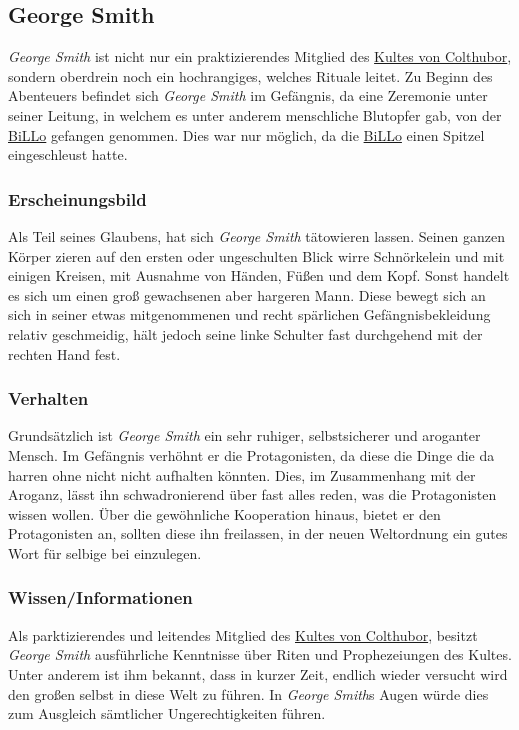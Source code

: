 \subsection{George Smith}
\label{pers:george-smith}
    \emph{George Smith} ist nicht nur ein praktizierendes Mitglied des \hyperref[sons:kult-von-colthubor]{Kultes von Colthubor}, sondern oberdrein noch ein hochrangiges, welches Rituale leitet. Zu Beginn des Abenteuers befindet sich \emph{George Smith} im Gefängnis, da eine Zeremonie unter seiner Leitung, in welchem es unter anderem menschliche Blutopfer gab, von der \hyperref[subsubsec:billo]{BiLLo} gefangen genommen. Dies war nur möglich, da die \hyperref[subsubsec:billo]{BiLLo} einen Spitzel eingeschleust hatte.

    \subsubsection{Erscheinungsbild}
        Als Teil seines Glaubens, hat sich \emph{George Smith} tätowieren lassen. Seinen ganzen Körper zieren auf den ersten oder ungeschulten Blick wirre Schnörkelein und mit einigen Kreisen, mit Ausnahme von Händen, Füßen und dem Kopf. Sonst handelt es sich um einen groß gewachsenen aber hargeren Mann. Diese bewegt sich an sich in seiner etwas mitgenommenen und recht spärlichen Gefängnisbekleidung relativ geschmeidig, hält jedoch seine linke Schulter fast durchgehend mit der rechten Hand fest.

    \subsubsection{Verhalten}
        Grundsätzlich ist \emph{George Smith} ein sehr ruhiger, selbstsicherer und aroganter Mensch. Im Gefängnis verhöhnt er die Protagonisten, da diese die Dinge die da harren ohne nicht nicht aufhalten könnten. Dies, im Zusammenhang mit der Aroganz, lässt ihn schwadronierend über fast alles reden, was die Protagonisten wissen wollen. Über die gewöhnliche Kooperation hinaus, bietet er den Protagonisten an, sollten diese ihn freilassen, in der neuen Weltordnung ein gutes Wort für selbige bei  einzulegen.

    \subsubsection{Wissen/Informationen}
        Als parktizierendes und leitendes Mitglied des \hyperref[sons:kult-von-colthubor]{Kultes von Colthubor}, besitzt \emph{George Smith} ausführliche Kenntnisse über Riten und Prophezeiungen des Kultes. Unter anderem ist ihm bekannt, dass in kurzer Zeit, endlich wieder versucht wird den großen  selbst in diese Welt zu führen. In \emph{George Smith}s Augen würde dies zum Ausgleich sämtlicher Ungerechtigkeiten führen.

